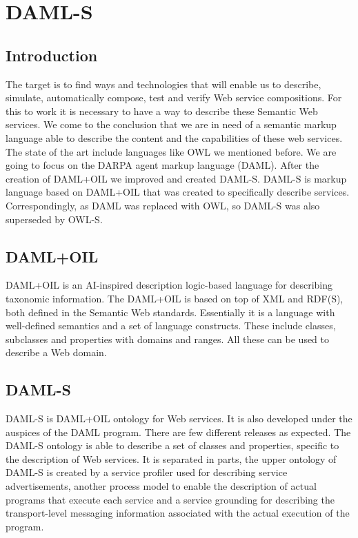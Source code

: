 \section*{DAML-S}

\subsection*{Introduction}
The target is to find ways and technologies that will enable us to describe, simulate, automatically compose, test and verify Web service compositions.
For this to work it is necessary to have a way to describe these Semantic Web services. We come to the conclusion that we are in need of a semantic markup language able to describe the content and the capabilities of these web services. The state of the art include languages like OWL we mentioned before. We are going to focus on the DARPA agent markup language (DAML). After the creation of DAML+OIL we improved and created DAML-S. DAML-S is markup language based on DAML+OIL that was created to specifically describe services. Correspondingly, as DAML was replaced with OWL, so DAML-S was also superseded by OWL-S.

\subsection*{DAML+OIL}
DAML+OIL is an AI-inspired description logic-based language for describing taxonomic information. The DAML+OIL is based on top of XML and RDF(S), both defined in the Semantic Web standards. Essentially it is a language with well-defined semantics and a set of language constructs. These include classes, subclasses and properties with domains and ranges. All these can be used to describe a Web domain.

\subsection*{DAML-S}
DAML-S is DAML+OIL ontology for Web services. It is also developed under the auspices of the DAML program. There are few different releases as expected. The DAML-S ontology is able to describe a set of classes and properties, specific to the description of Web services.
It is separated in parts, the upper ontology of DAML-S is created by a service profiler used for describing service advertisements, another process model to enable the description of actual programs that execute each service and a service grounding for describing the transport-level messaging information associated with the actual execution of the program.

